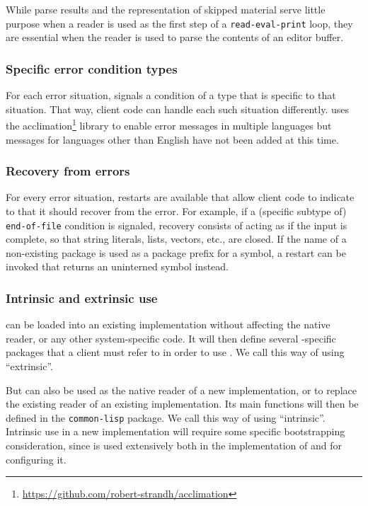 While parse results and the representation of skipped material serve
little purpose when a reader is used as the first step of a
\texttt{read-eval-print} loop, they are essential when the reader is
used to parse the contents of an editor buffer.

\subsubsection{Specific error condition types}

For each error situation, \eclector{} signals a condition of a type
that is specific to that situation.  That way, client code can handle
each such situation differently.  \eclector{} uses the
acclimation\footnote{\url{https://github.com/robert-strandh/acclimation}}
library to enable error messages in multiple languages but messages
for languages other than English have not been added at this time.

\subsubsection{Recovery from errors}

For every error situation, restarts are available that allow client
code to indicate to \eclector{} that it should recover from the error.
For example, if a (specific subtype of) \texttt{end-of-file} condition
is signaled, recovery consists of acting as if the input is complete,
so that string literals, lists, vectors, etc., are closed.  If the
name of a non-existing package is used as a package prefix for a
symbol, a restart can be invoked that returns an uninterned symbol
instead.

\subsubsection{Intrinsic and extrinsic use}

\eclector{} can be loaded into an existing \cl{} implementation
without affecting the native reader, or any other system-specific
code.  It will then define several \eclector{}-specific packages that
a client must refer to in order to use \eclector{}.  We call this way
of using \eclector{} ``extrinsic''.

But \eclector{} can also be used as the native reader of a new \cl{}
implementation, or to replace the existing reader of an existing \cl{}
implementation.  Its main functions will then be defined in the
\texttt{common-lisp} package.  We call this way of using \eclector{}
``intrinsic''.  Intrinsic use in a new \cl{} implementation will
require some specific bootstrapping consideration, since
\clos{} is used extensively both in the implementation of \eclector{}
and for configuring it.

